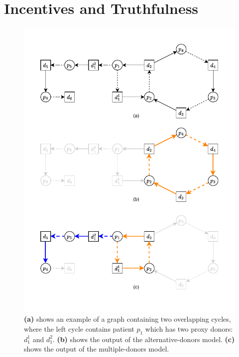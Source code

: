 \chapter{Incentives and Truthfulness}
\label{cha:incentives_and_truthfulness}

\begin{figure}
    \centering
    \includegraphics{data/incentive_motivation_example.pdf}
    \caption[An example showing the difference between alternative-donors model and multiple-donors model]{\textbf{(a)} shows an example of a graph containing two overlapping cycles, where the left cycle contains patient $p_1$ which has two proxy donors: $d_1^1$ and $d_1^2$. \textbf{(b)} shows the output of the alternative-donors model. \textbf{(c)} shows the output of the multiple-donors model.}
    \label{fig:incentive_motivation_example}
\end{figure}


